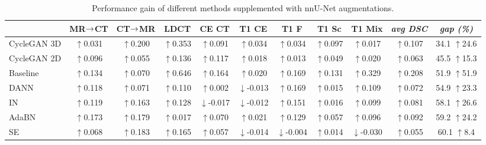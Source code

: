

\begin{landscape}
\begin{table}[p]
	\centering
	\caption{Performance gain of different methods supplemented with nnU-Net augmentations.}
	
		\begin{tabular}{lcccccccccc}
			\toprule
			& MR$\rightarrow$CT & CT$\rightarrow$MR & LDCT & CE CT & T1 CE & T1 F & T1 Sc & T1 Mix & \textit{avg DSC} & \textit{gap (\%)} \\
			
			\midrule
			
			CycleGAN 3D & $\uparrow$0.031 & $\uparrow$0.200 & $\uparrow$0.353 & $\uparrow$0.091 & $\uparrow$0.034 & $\uparrow$0.034 & $\uparrow$0.097 & $\uparrow$0.017 & $\uparrow$0.107 & 34.1 $\uparrow$24.6 \\
			
			CycleGAN 2D & $\uparrow$0.096 & $\uparrow$0.055 & $\uparrow$0.136 & $\uparrow$0.117 & $\uparrow$0.018 & $\uparrow$0.013 & $\uparrow$0.049 & $\uparrow$0.020 & $\uparrow$0.063 & 45.5 $\uparrow$15.3 \\
			
			Baseline & $\uparrow$0.134 & $\uparrow$0.070 & $\uparrow$0.646 & $\uparrow$0.164 & $\uparrow$0.020 & $\uparrow$0.169 & $\uparrow$0.131 & $\uparrow$0.329 & $\uparrow$0.208 & 51.9 $\uparrow$51.9 \\
			
			DANN        & $\uparrow$0.118 & $\uparrow$0.071 & $\uparrow$0.110 & $\uparrow$0.002 & $\downarrow$-0.013 & $\uparrow$0.169 & $\uparrow$0.015 & $\uparrow$0.109 & $\uparrow$0.072 & 54.9 $\uparrow$23.3 \\
			
			IN          & $\uparrow$0.119 & $\uparrow$0.163 & $\uparrow$0.128 & $\downarrow$-0.017 & $\downarrow$-0.012 & $\uparrow$0.151 & $\uparrow$0.016 & $\uparrow$0.099 & $\uparrow$0.081 & 58.1 $\uparrow$26.6 \\
			
			AdaBN       & $\uparrow$0.173 & $\uparrow$0.179 & $\uparrow$0.017 & $\uparrow$0.070 & $\uparrow$0.021 & $\uparrow$0.129 & $\uparrow$0.057 & $\uparrow$0.096 & $\uparrow$0.092 & 59.2 $\uparrow$24.2 \\
			
			SE          & $\uparrow$0.068 & $\uparrow$0.183 & $\uparrow$0.165 & $\uparrow$0.057 & $\downarrow$-0.014 & $\downarrow$-0.004 & $\uparrow$0.014 & $\downarrow$-0.030 & $\uparrow$0.055 & 60.1 \enspace $\uparrow$8.4 \\
			

\end{tabular}
\end{table}
\end{landscape}
